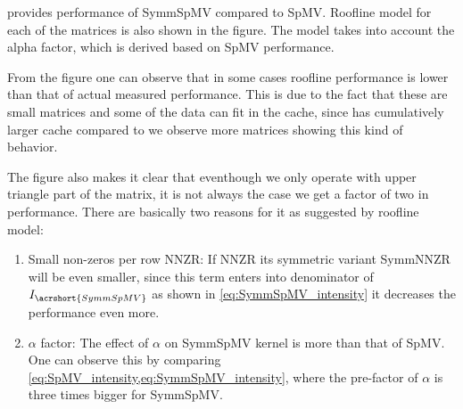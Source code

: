  provides performance of SymmSpMV compared to SpMV. Roofline \cite{Williams_roofline} model for each of the matrices is also shown in the figure. The model takes into account the alpha factor, which is derived based on SpMV performance.

 From the figure one can observe that in some cases roofline performance is lower than that of actual measured performance. This is due to the fact that these are small matrices and some of the data can fit in the cache, since \SKX has cumulatively larger cache compared to \IVB we observe more matrices showing this kind of behavior.
 
 The figure also makes it clear that eventhough we only operate with upper triangle part of the matrix, it is not always the case we get a factor of two in performance. There are basically two reasons for it as suggested by roofline model:
 \begin{enumerate}
 	\item Small non-zeros per row \acrshort{NNZR}: If \acrshort{NNZR} its symmetric variant \acrshort{SymmNNZR} will be even smaller, since this term enters into denominator of $I_{\acrshort{SymmSpMV}}$ as shown in \cref{eq:SymmSpMV_intensity} it decreases the performance even more.
 	\item $\alpha$ factor: The effect of $\alpha$ on \acrshort{SymmSpMV} kernel is more than that of \acrshort{SpMV}. One can observe this by comparing \cref{eq:SpMV_intensity,eq:SymmSpMV_intensity}, where the  pre-factor of $\alpha$ is three times bigger for \acrshort{SymmSpMV}.
 \end{enumerate}

